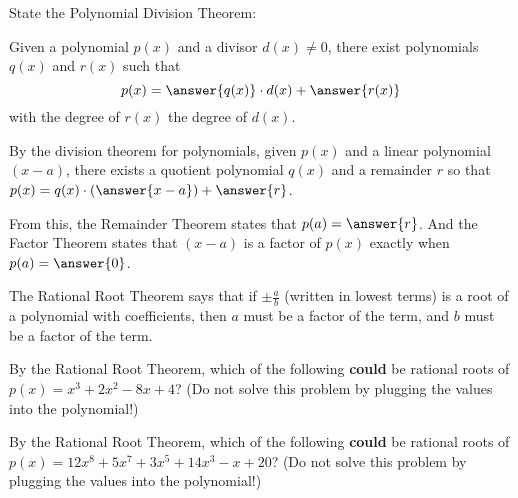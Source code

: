\documentclass[nooutcomes]{ximera}
\begin{document}
\begin{problem}
State the Polynomial Division Theorem: 

Given a polynomial $p(x)$ and a divisor $d(x)\ne 0$, there exist polynomials $q(x)$ and $r(x)$ such that 
\[
p(x) = \answer{q(x)}\cdot d(x)+\answer{r(x)}
\]
with the degree of $r(x)$ 
\wordChoice{\choice{$=$} \choice[correct]{$<$} \choice{$\le$} \choice{$\ne$} \choice{$>$}}
the degree of $d(x)$. 
\end{problem}

\begin{problem}
By the division theorem for polynomials, given $p(x)$ and a linear polynomial $(x-a)$, there exists a quotient polynomial $q(x)$ and a remainder $r$ so that $p(x)= q(x)\cdot\left(\answer{x-a}\right) + \answer{r}$.  

From this, the Remainder Theorem states that $p(a)=\answer{r}$.  And the Factor Theorem states that $(x-a)$ is a factor of $p(x)$ exactly when $p(a)=\answer{0}$.
\end{problem}

\begin{problem}
The Rational Root Theorem says that if $\pm \frac{a}{b}$ (written in lowest terms) is a root of a polynomial with 
coefficients, then $a$ must be a factor of the 
 term, and $b$ must be a factor of the 
term.
\end{problem}

\begin{problem}
By the Rational Root Theorem, which of the following \textbf{could} be rational roots of $p(x) = x^3 + 2x^2 - 8x + 4$?   
(Do not solve this problem by plugging the values into the polynomial!)
\begin{selectAll}
\end{selectAll}
\end{problem}




\begin{problem}
By the Rational Root Theorem, which of the following \textbf{could} be rational roots of $p(x) = 12x^8 + 5x^7 + 3x^5 + 14x^3 - x + 20$?
(Do not solve this problem by plugging the values into the polynomial!)
\begin{selectAll}
\end{selectAll}
\end{problem}
\end{document}
